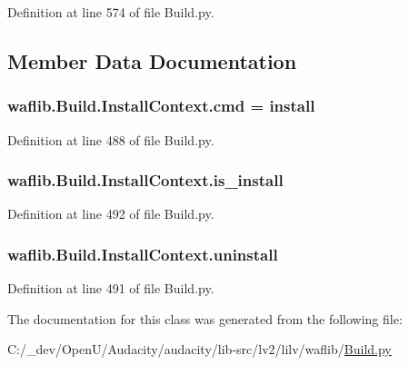 Definition at line 574 of file Build.\+py.



\subsection{Member Data Documentation}
\subsubsection[{\texorpdfstring{cmd}{cmd}}]{ waflib.\+Build.\+Install\+Context.\+cmd = \textquotesingle{}install\textquotesingle{}\hspace{0.3cm}{\ttfamily [static]}}\hypertarget{classwaflib_1_1_build_1_1_install_context_a7cc57a3d605428350f0a04f38a3889f2}{}\label{classwaflib_1_1_build_1_1_install_context_a7cc57a3d605428350f0a04f38a3889f2}


Definition at line 488 of file Build.\+py.

\subsubsection[{\texorpdfstring{is\+\_\+install}{is_install}}]{\setlength{\rightskip}{0pt plus 5cm}waflib.\+Build.\+Install\+Context.\+is\+\_\+install}\hypertarget{classwaflib_1_1_build_1_1_install_context_a2473e594d14a9c10babf612ab8f6947b}{}\label{classwaflib_1_1_build_1_1_install_context_a2473e594d14a9c10babf612ab8f6947b}


Definition at line 492 of file Build.\+py.

\subsubsection[{\texorpdfstring{uninstall}{uninstall}}]{\setlength{\rightskip}{0pt plus 5cm}waflib.\+Build.\+Install\+Context.\+uninstall}\hypertarget{classwaflib_1_1_build_1_1_install_context_ad779be37918b1fd345eed29e990c7afb}{}\label{classwaflib_1_1_build_1_1_install_context_ad779be37918b1fd345eed29e990c7afb}


Definition at line 491 of file Build.\+py.



The documentation for this class was generated from the following file\+:\begin{DoxyCompactItemize}
\item 
C\+:/\+\_\+dev/\+Open\+U/\+Audacity/audacity/lib-\/src/lv2/lilv/waflib/\hyperlink{lilv_2waflib_2_build_8py}{Build.\+py}\end{DoxyCompactItemize}
